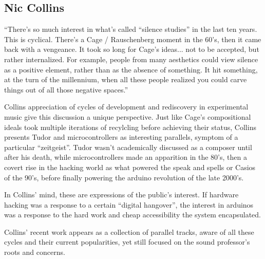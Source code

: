 


\subsection{Nic Collins}

``There’s so much interest in what’s called ``silence studies'' in the last ten years. This is cyclical. There’s a Cage / Rauschenberg moment in the 60’s, then it came back with a vengeance. It took so long for Cage’s ideas... not to be accepted, but rather internalized. For example, people from many aesthetics could view silence as a positive element, rather than as the absence of something. It hit something, at the turn of the millennium, when all these people realized you could carve things out of all those negative spaces.''

Collins appreciation of cycles of development and rediscovery in experimental music give this discussion a unique perspective. Just like Cage's compositional ideals took multiple iterations of recylcling before achieving their status, Collins presents Tudor and microcontrollers as interesting parallels, symptom of a particular ``zeitgeist''. Tudor wasn't academically discussed as a composer until after his death, while microcontrollers made an apparition in the 80's, then a covert rise in the hacking world as what powered the speak and spells or Casios of the 90's, before finally powering the arduino revolution of the late 2000's.

In Collins' mind, these are expressions of the public's interest. If hardware hacking was a response to a certain ``digital hangover'', the interest in arduinos was a response to the hard work and cheap accessibility the system encapsulated. 

Collins' recent work appears as a collection of parallel tracks, aware of all these cycles and their current popularities, yet still focused on the sound professor's roots and concerns. 

